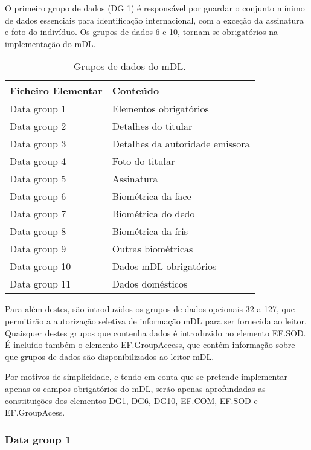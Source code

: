 O primeiro grupo de dados (DG 1) é responsável por guardar o conjunto mínimo de dados essenciais para identificação internacional, com a exceção da assinatura e foto do indivíduo. Os grupos de dados 6 e 10, tornam-se obrigatórios na implementação do mDL. 

\begin{table}[H]
\centering
\caption{Grupos de dados do mDL.}
\label{table:grupos_dados}
\vspace{0.2cm}
\begin{tabular}{|l|l|}
\hline
\rowcolor[HTML]{EFEFEF}
Ficheiro Elementar & Conteúdo \\ \hline
Data group 1 & Elementos obrigatórios \\ \hline
Data group 2 & Detalhes do titular \\ \hline
Data group 3 & Detalhes da autoridade emissora \\ \hline
Data group 4 & Foto do titular \\ \hline
Data group 5 & Assinatura \\ \hline
Data group 6 & Biométrica da face \\ \hline
Data group 7 & Biométrica do dedo \\ \hline
Data group 8 & Biométrica da íris \\ \hline
Data group 9 & Outras biométricas \\ \hline
Data group 10 & Dados mDL obrigatórios \\ \hline
Data group 11 & Dados domésticos \\ \hline
\end{tabular}
\end{table}

Para além destes, são introduzidos os grupos de dados opcionais 32 a 127, que permitirão a autorização seletiva de informação mDL para ser fornecida ao leitor. Quaisquer destes grupos que contenha dados é introduzido no elemento EF.SOD. É incluído também o elemento EF.GroupAccess, que contém informação sobre que grupos de dados são disponibilizados ao leitor mDL.

Por motivos de simplicidade, e tendo em conta que se pretende implementar apenas os campos obrigatórios do mDL, serão apenas aprofundadas as constituições dos elementos DG1, DG6, DG10, EF.COM, EF.SOD e EF.GroupAcess.

\subsubsection{Data group 1}

